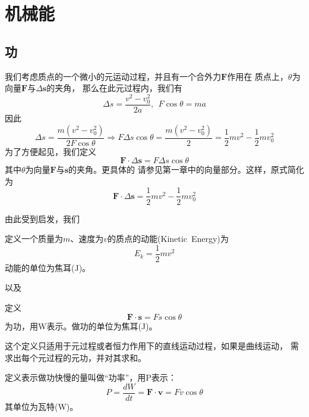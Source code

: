 \section{机械能}
\subsection{功}
我们考虑质点的一个微小的元运动过程，并且有一个合外力$\boldsymbol{F}$作用在
质点上，$\theta$为向量$\boldsymbol{F}$与$\Delta \boldsymbol{s}$的夹角，
那么在此元过程内，我们有
\begin{equation}
    \Delta s=\frac{v^2-v_0^2}{2a},~~F\cos\theta =ma
\end{equation}
因此 
\begin{equation}
    \Delta s=\frac{m(v^2-v_0^2)}{2F\cos\theta}\Rightarrow 
    F\Delta s\cos\theta=\frac{m(v^2-v_0^2)}{2}
    =\frac{1}{2}mv^2-\frac{1}{2}mv_0^2
\end{equation}
为了方便起见，我们定义
\begin{equation}
    \boldsymbol{F}\cdot \Delta\boldsymbol{s}=F\Delta s\cos\theta
\end{equation}
其中$\theta$为向量$\boldsymbol{F}$与$\boldsymbol{s}$的夹角。更具体的
请参见第一章中的向量部分。这样，原式简化为 
\begin{equation}
    \boldsymbol{F}\cdot \Delta \boldsymbol{s}=\frac{1}{2}mv^2-\frac{1}{2}mv_0^2
\end{equation}

由此受到启发，我们
\begin{definition}
    定义一个质量为$m$、速度为$v$的质点的动能(Kinetic~Energy)为
    \begin{equation}
        E_k=\frac{1}{2}mv^2
    \end{equation}
    动能的单位为焦耳(J)。
\end{definition}
以及 
\begin{definition}
    定义 
    \begin{equation}
        \boldsymbol{F}\cdot \boldsymbol{s}=Fs\cos\theta
    \end{equation}
    为功，用W表示。做功的单位为焦耳(J)。
\end{definition}

这个定义只适用于元过程或者恒力作用下的直线运动过程，如果是曲线运动，
需求出每个元过程的元功，并对其求和。

\begin{definition}
    定义表示做功快慢的量叫做“功率”，用P表示：
    \begin{equation}
        P=\frac{dW}{dt}=\boldsymbol{F}\cdot \boldsymbol{v}=Fv\cos\theta
    \end{equation}
    其单位为瓦特(W)。
\end{definition}
